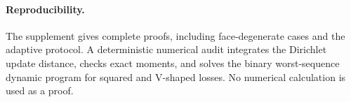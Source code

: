 \documentclass[twoside]{article}
\begin{document}
\paragraph{Reproducibility.} The supplement gives complete proofs, including face-degenerate cases and the adaptive protocol. A deterministic numerical audit integrates the Dirichlet update distance, checks exact moments, and solves the binary worst-sequence dynamic program for squared and V-shaped losses. No numerical calculation is used as a proof.


\end{document}

